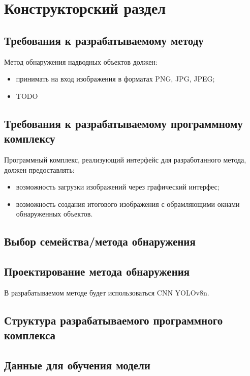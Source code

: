 \chapter{Конструкторский раздел}

\section{Требования к разрабатываемому методу}

Метод обнаружения надводных объектов должен:
\begin{itemize}[label=---]
    \item принимать на вход изображения в форматах PNG, JPG, JPEG;
    \item TODO
\end{itemize}

\section{Требования к разрабатываемому программному комплексу}

Программный комплекс, реализующий интерфейс для разработанного метода, должен предоставлять:
\begin{itemize}[label=---]
    \item возможность загрузки изображений через графический интерфес;
    \item возможность создания итогового изображения с обрамляющими окнами обнаруженных объектов.
\end{itemize}

\section{Выбор семейства/метода обнаружения}

\section{Проектирование метода обнаружения}

В разрабатываемом методе будет использоваться CNN YOLOv8n.

\section{Структура разрабатываемого программного комплекса}

\section{Данные для обучения модели}

